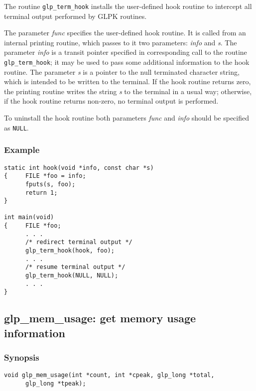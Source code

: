 The routine \verb|glp_term_hook| installs the user-defined hook routine
to intercept all terminal output performed by GLPK routines.


The parameter {\it func} specifies the user-defined hook routine. It is
called from an internal printing routine, which passes to it two
parameters: {\it info} and {\it s}. The parameter {\it info} is a
transit pointer specified in corresponding call to the routine
\verb|glp_term_hook|; it may be used to pass some additional information
to the hook routine. The parameter {\it s} is a pointer to the null
terminated character string, which is intended to be written to the
terminal. If the hook routine returns zero, the printing routine writes
the string {\it s} to the terminal in a usual way; otherwise, if the
hook routine returns non-zero, no terminal output is performed.

To uninstall the hook routine both parameters {\it func} and {\it info}
should be specified as \verb|NULL|.

\subsubsection*{Example}

\begin{verbatim}
static int hook(void *info, const char *s)
{     FILE *foo = info;
      fputs(s, foo);
      return 1;
}

int main(void)
{     FILE *foo;
      . . .
      /* redirect terminal output */
      glp_term_hook(hook, foo);
      . . .
      /* resume terminal output */
      glp_term_hook(NULL, NULL);
      . . .
}
\end{verbatim}

\subsection{glp\_mem\_usage: get memory usage information}

\subsubsection*{Synopsis}

\begin{verbatim}
void glp_mem_usage(int *count, int *cpeak, glp_long *total,
      glp_long *tpeak);
\end{verbatim}

